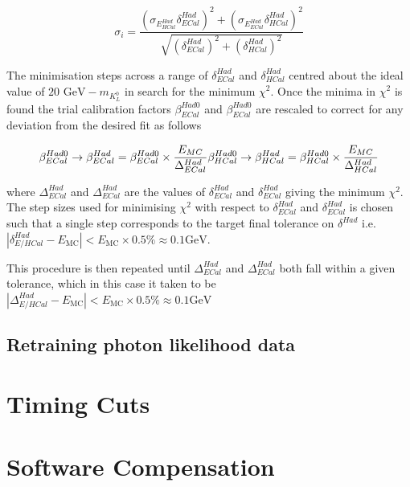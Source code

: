 \begin{equation}
\sigma_{i} = \frac{(\sigma_{E^{Had}_{HCal}}  \delta^{Had}_{ECal})^{2} + (\sigma_{E^{Had}_{ECal}} \delta^{Had}_{HCal})^{2}}{\sqrt{(\delta^{Had}_{ECal})^{2} + (\delta^{Had}_{HCal})^{2}}}
\label{equ:sigmaxicalc}
\end{equation}

The minimisation steps across a range of $\delta^{Had}_{ECal}$ and $\delta^{Had}_{HCal}$ centred about the ideal value of $20 \text { GeV} - m_{K^{0}_{L}}$ in search for the minimum $\chi^{2}$.  Once the minima in $\chi^{2}$ is found the trial calibration factors $\beta^{Had0}_{ECal}$ and $\beta^{Had0}_{ECal}$ are rescaled to correct for any deviation from the desired fit as follows

\begin{equation}
\beta^{Had0}_{ECal} \rightarrow \beta^{Had}_{ECal} = \beta^{Had0}_{ECal} \times \frac{E_{MC}}{\Delta^{Had}_{ECal}} \\
\beta^{Had0}_{HCal} \rightarrow \beta^{Had}_{HCal} = \beta^{Had0}_{HCal} \times \frac{E_{MC}}{\Delta^{Had}_{HCal}}
\end{equation}

where $\Delta^{Had}_{ECal}$ and $\Delta^{Had}_{ECal}$ are the values of $\delta^{Had}_{ECal}$ and $\delta^{Had}_{ECal}$ giving the minimum $\chi^{2}$.  The step sizes used for minimising $\chi^{2}$ with respect to $\delta^{Had}_{ECal}$ and $\delta^{Had}_{ECal}$ is chosen such that a single step corresponds to the target final tolerance on $\delta^{Had}$ i.e. $|\delta^{Had}_{E/HCal} - E_{\text{MC}}| < E_{\text{MC}} \times 0.5 \% \approx 0.1 \text{GeV}$.  

This procedure is then repeated until $\Delta^{Had}_{ECal}$ and $\Delta^{Had}_{ECal}$ both fall within a given tolerance, which in this case it taken to be $|\Delta^{Had}_{E/HCal} - E_{\text{MC}}| < E_{\text{MC}} \times 0.5 \% \approx 0.1 \text{GeV}$


\subsection{Retraining photon likelihood data}



\section{Timing Cuts}


\section{Software Compensation}


